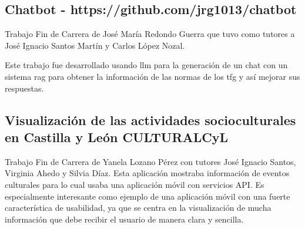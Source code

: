 \subsection{Chatbot - https://github.com/jrg1013/chatbot}
Trabajo Fin de Carrera de José María Redondo Guerra que tuvo como tutores a José Ignacio Santos Martín y Carlos López Nozal.

Este trabajo fue desarrollado usando \acrfull{llm} para la generación de un chat con un sistema \acrshort{rag} para obtener la información de las normas de los \acrshort{tfg} y así mejorar sus respuestas.

\subsection{Visualización de las actividades socioculturales en Castilla y León CULTURALCyL}
Trabajo Fin de Carrera de Yanela Lozano Pérez con tutores José Ignacio Santos, Virginia Ahedo y Silvia Díaz.
Esta aplicación mostraba información de eventos culturales para lo cual usaba una aplicación móvil con servicios API.
Es especialmente interesante como ejemplo de una aplicación móvil con una fuerte característica de usabilidad, ya que se centra en la visualización de mucha información que debe recibir el usuario de manera clara y sencilla.

\newpage

